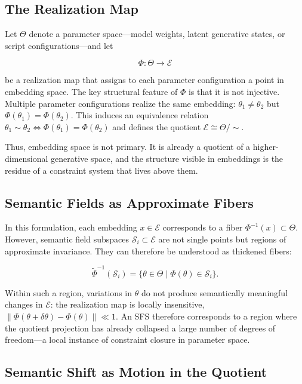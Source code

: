 \documentclass[11pt, twoside]{article}
\theoremstyle{plain}
\theoremstyle{definition}
\theoremstyle{remark}
\begin{document}
\subsection{The Realization Map}

Let $\Theta$ denote a parameter space---model weights, latent generative states, or script configurations---and let

\[
\Phi : \Theta \to \mathcal{E}
\]

be a realization map that assigns to each parameter configuration a point in embedding space. The key structural feature of $\Phi$ is that it is not injective. Multiple parameter configurations realize the same embedding: $\theta_1 \neq \theta_2$ but $\Phi(\theta_1) = \Phi(\theta_2)$. This induces an equivalence relation $\theta_1 \sim \theta_2 \iff \Phi(\theta_1) = \Phi(\theta_2)$ and defines the quotient $\mathcal{E} \cong \Theta / {\sim}$.

Thus, embedding space is not primary. It is already a quotient of a higher-dimensional generative space, and the structure visible in embeddings is the residue of a constraint system that lives above them.

\subsection{Semantic Fields as Approximate Fibers}

In this formulation, each embedding $x \in \mathcal{E}$ corresponds to a fiber $\Phi^{-1}(x) \subset \Theta$. However, semantic field subspaces $\mathcal{S}_i \subset \mathcal{E}$ are not single points but regions of approximate invariance. They can therefore be understood as thickened fibers:

\[
\widetilde{\Phi}^{-1}(\mathcal{S}_i) = \{ \theta \in \Theta \mid \Phi(\theta) \in \mathcal{S}_i \}.
\]

Within such a region, variations in $\theta$ do not produce semantically meaningful changes in $\mathcal{E}$: the realization map is locally insensitive, $\|\Phi(\theta + \delta\theta) - \Phi(\theta)\| \ll 1$. An SFS therefore corresponds to a region where the quotient projection has already collapsed a large number of degrees of freedom---a local instance of constraint closure in parameter space.

\subsection{Semantic Shift as Motion in the Quotient}
\end{document}
